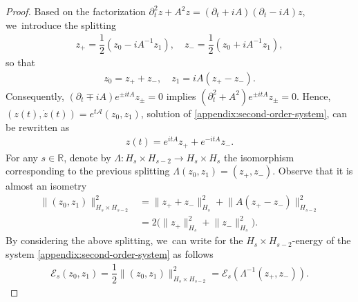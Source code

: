 \documentclass[JEP,XML,SOM,Unicode,published]{cedram}
\theoremstyle{definition}
\let\mc\mathcal
\let\Ld\Lambda
\newcommand{\A}{\mc{A}}
\newcommand{\E}{\mc{E}}
\newcommand{\R}{\mathbb{R}}
\providecommand{\norm}[1]{\lVert#1\rVert}
\begin{document}
\begin{proof}
Based on the factorization $\partial_t^2 z+A^2z=(\partial_t+iA)(\partial_t-iA)z$, we~introduce the splitting
\begin{align*}
z_+=\dfrac{1}{2}(z_0-iA^{-1}z_1),\quad z_-=\dfrac{1}{2}(z_0+iA^{-1}z_1),
\end{align*}
so that
\begin{align*}
z_0=z_++z_-,\quad z_1=iA(z_+-z_-).
\end{align*}
Consequently, $(\partial_t\mp iA)e^{\pm itA}z_{\pm}=0$ implies $(\partial_t^2+A^2)e^{\pm itA}z_{\pm}=0$. Hence, $(z(t), \dot{z}(t))=e^{t\A}(z_0, z_1)$, solution of \eqref{appendix:second-order-system}, can be rewritten as
\begin{align*}
z(t)=e^{itA}z_++e^{-itA}z_-.
\end{align*}
For any $s\in \R$, denote by $\Lambda: H_s\times H_{s-2}\to H_s\times H_s$ the isomorphism corresponding to the previous splitting $\Lambda(z_0, z_1)=(z_+, z_-)$. Observe that it is almost an isometry
\begin{align*}
\norm{(z_0, z_1)}_{H_s\times H_{s-2}}^2&=\norm{z_++z_-}_{H_s}^2+\norm{A(z_+-z_-)}_{H_{s-2}}^2\\&=2\big(\norm{z_+}_{H_s}^2+\norm{z_-}_{H_s}^2\big).
\end{align*}
By considering the above splitting, we~can write for the $H_s\times H_{s-2}$-energy of the system \eqref{appendix:second-order-system} as follows
\begin{align*}
\E_s(z_0, z_1)=\dfrac{1}{2}\norm{(z_0, z_1)}_{H_{s}\times H_{s-2}}^2=\E_s(\Ld^{-1}(z_+, z_-)).
\end{align*}


\end{proof}
\end{document}
